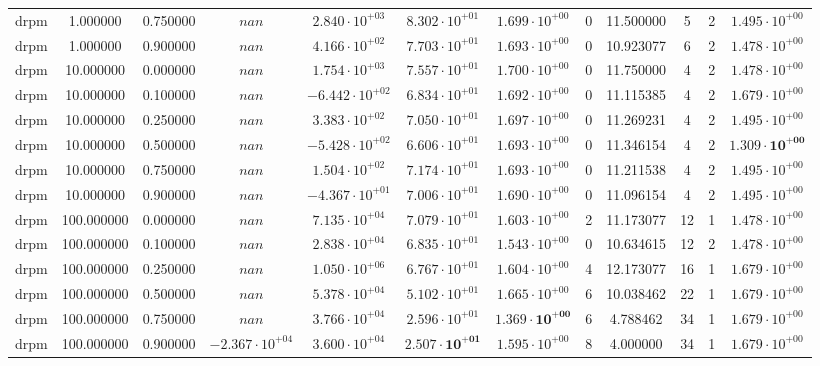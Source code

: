 \begin{table}
\begin{tabular}{cccccccccccc}
drpm & 1.000000 & 0.750000 & $nan$ & $2.840 \cdot 10^{+03}$ & $8.302 \cdot 10^{+01}$ & $1.699 \cdot 10^{+00}$ & 0 & 11.500000 & 5 & 2 & $1.495 \cdot 10^{+00}$ \\
drpm & 1.000000 & 0.900000 & $nan$ & $4.166 \cdot 10^{+02}$ & $7.703 \cdot 10^{+01}$ & $1.693 \cdot 10^{+00}$ & 0 & 10.923077 & 6 & 2 & $1.478 \cdot 10^{+00}$ \\
drpm & 10.000000 & 0.000000 & $nan$ & $1.754 \cdot 10^{+03}$ & $7.557 \cdot 10^{+01}$ & $1.700 \cdot 10^{+00}$ & 0 & 11.750000 & 4 & 2 & $1.478 \cdot 10^{+00}$ \\
drpm & 10.000000 & 0.100000 & $nan$ & $-6.442 \cdot 10^{+02}$ & $6.834 \cdot 10^{+01}$ & $1.692 \cdot 10^{+00}$ & 0 & 11.115385 & 4 & 2 & $1.679 \cdot 10^{+00}$ \\
drpm & 10.000000 & 0.250000 & $nan$ & $3.383 \cdot 10^{+02}$ & $7.050 \cdot 10^{+01}$ & $1.697 \cdot 10^{+00}$ & 0 & 11.269231 & 4 & 2 & $1.495 \cdot 10^{+00}$ \\
drpm & 10.000000 & 0.500000 & $nan$ & $-5.428 \cdot 10^{+02}$ & $6.606 \cdot 10^{+01}$ & $1.693 \cdot 10^{+00}$ & 0 & 11.346154 & 4 & 2 & $\mathbf{1.309 \cdot 10^{+00}}$ \\
drpm & 10.000000 & 0.750000 & $nan$ & $1.504 \cdot 10^{+02}$ & $7.174 \cdot 10^{+01}$ & $1.693 \cdot 10^{+00}$ & 0 & 11.211538 & 4 & 2 & $1.495 \cdot 10^{+00}$ \\
drpm & 10.000000 & 0.900000 & $nan$ & $-4.367 \cdot 10^{+01}$ & $7.006 \cdot 10^{+01}$ & $1.690 \cdot 10^{+00}$ & 0 & 11.096154 & 4 & 2 & $1.495 \cdot 10^{+00}$ \\
drpm & 100.000000 & 0.000000 & $nan$ & $7.135 \cdot 10^{+04}$ & $7.079 \cdot 10^{+01}$ & $1.603 \cdot 10^{+00}$ & 2 & 11.173077 & 12 & 1 & $1.478 \cdot 10^{+00}$ \\
drpm & 100.000000 & 0.100000 & $nan$ & $2.838 \cdot 10^{+04}$ & $6.835 \cdot 10^{+01}$ & $1.543 \cdot 10^{+00}$ & 0 & 10.634615 & 12 & 2 & $1.478 \cdot 10^{+00}$ \\
drpm & 100.000000 & 0.250000 & $nan$ & $1.050 \cdot 10^{+06}$ & $6.767 \cdot 10^{+01}$ & $1.604 \cdot 10^{+00}$ & 4 & 12.173077 & 16 & 1 & $1.679 \cdot 10^{+00}$ \\
drpm & 100.000000 & 0.500000 & $nan$ & $5.378 \cdot 10^{+04}$ & $5.102 \cdot 10^{+01}$ & $1.665 \cdot 10^{+00}$ & 6 & 10.038462 & 22 & 1 & $1.679 \cdot 10^{+00}$ \\
drpm & 100.000000 & 0.750000 & $nan$ & $3.766 \cdot 10^{+04}$ & $2.596 \cdot 10^{+01}$ & $\mathbf{1.369 \cdot 10^{+00}}$ & 6 & 4.788462 & 34 & 1 & $1.679 \cdot 10^{+00}$ \\
drpm & 100.000000 & 0.900000 & $-2.367 \cdot 10^{+04}$ & $3.600 \cdot 10^{+04}$ & $\mathbf{2.507 \cdot 10^{+01}}$ & $1.595 \cdot 10^{+00}$ & 8 & 4.000000 & 34 & 1 & $1.679 \cdot 10^{+00}$ \\
\bottomrule
\end{tabular}
\end{table}
